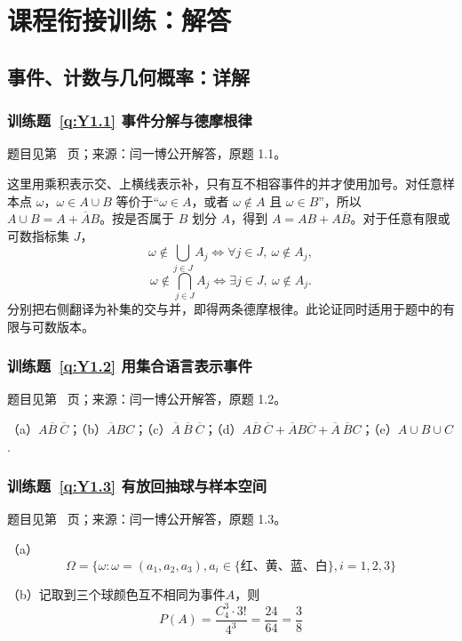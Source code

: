 \setcounter{chapter}{4} %
\chapter{课程衔接训练：解答}

\clearpage\section*{事件、计数与几何概率：详解}

\subsection*{训练题~\ref{q:Y1.1} 事件分解与德摩根律}\label{a:Y1.1}{\small 题目见第~\pageref{q:Y1.1} 页；来源：闫一博公开解答，原题 1.1。}
\begin{solve}这里用乘积表示交、上横线表示补，只有互不相容事件的并才使用加号。对任意样本点 $\omega$，$\omega\in A\cup B$ 等价于“$\omega\in A$，或者 $\omega\notin A$ 且 $\omega\in B$”，所以 $A\cup B=A+\overline AB$。按是否属于 $B$ 划分 $A$，得到 $A=AB+A\overline B$。对于任意有限或可数指标集 $J$，\[\omega\notin\bigcup_{j\in J}A_j\iff\forall j\in J,\ \omega\notin A_j,\]\[\omega\notin\bigcap_{j\in J}A_j\iff\exists j\in J,\ \omega\notin A_j.\]分别把右侧翻译为补集的交与并，即得两条德摩根律。此论证同时适用于题中的有限与可数版本。\end{solve}

\subsection*{训练题~\ref{q:Y1.2} 用集合语言表示事件}\label{a:Y1.2}{\small 题目见第~\pageref{q:Y1.2} 页；来源：闫一博公开解答，原题 1.2。}
\begin{solve}
（a）$A\overline{B}\:{\overline{C}}$；（b）$\overline{A}BC$；（c）$\overline{A}\:\overline{B}\:\overline{C}$；（d）$A\overline{B}\:\overline{C}+\overline{A}B\overline{C}+\overline{A}\:\overline{B}C$；（e）$A\cup B\cup C$.
\end{solve}

\subsection*{训练题~\ref{q:Y1.3} 有放回抽球与样本空间}\label{a:Y1.3}{\small 题目见第~\pageref{q:Y1.3} 页；来源：闫一博公开解答，原题 1.3。}
\begin{solve}
（a）
\[\Omega  = \{ \omega :\omega  = ({a_1},{a_2},{a_3}),{a_i} \in \{\text{红、黄、蓝、白} \} ,i = 1,2,3\} \]

（b）记取到三个球颜色互不相同为事件$A$，则
\[P(A) = \frac{{C_4^3}\cdot 3!}{{{4^3}}} = \frac{{24}}{{64}} = \frac{3}{8}\]
\end{solve}

